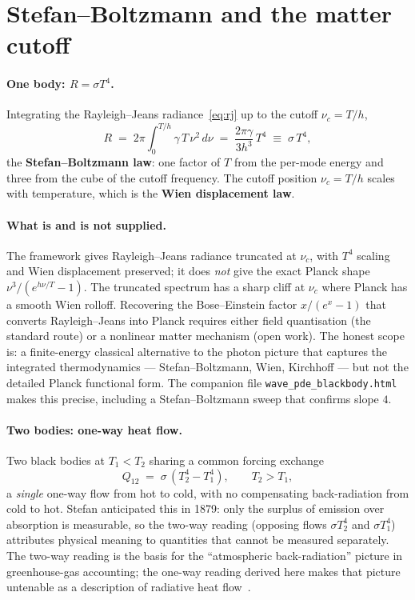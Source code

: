 \section{Stefan--Boltzmann and the matter cutoff}\label{sec:planck-cutoff}\label{sec:stefan-boltzmann}

\paragraph{One body: $R = \sigma T^4$.}
Integrating the Rayleigh--Jeans radiance~\eqref{eq:rj} up to the cutoff $\nu_c = T/h$,
\begin{equation}\label{eq:sb-onebody}
R \;=\; 2\pi\!\!\int_0^{T/h}\!\! \gamma\, T\, \nu^2\, d\nu \;=\; \frac{2\pi\gamma}{3h^3}\, T^4 \;\equiv\; \sigma\, T^4,
\end{equation}
the \textbf{Stefan--Boltzmann law}: one factor of $T$ from the per-mode energy and three from the cube of the cutoff frequency. The cutoff position $\nu_c = T/h$ scales with temperature, which is the \textbf{Wien displacement law}.

\paragraph{What is and is not supplied.}
The framework gives Rayleigh--Jeans radiance truncated at $\nu_c$, with $T^4$ scaling and Wien displacement preserved; it does \emph{not} give the exact Planck shape $\nu^3/(e^{h\nu/T}-1)$. The truncated spectrum has a sharp cliff at $\nu_c$ where Planck has a smooth Wien rolloff. Recovering the Bose--Einstein factor $x/(e^x-1)$ that converts Rayleigh--Jeans into Planck requires either field quantisation (the standard route) or a nonlinear matter mechanism (open work). The honest scope is: a finite-energy classical alternative to the photon picture that captures the integrated thermodynamics --- Stefan--Boltzmann, Wien, Kirchhoff --- but not the detailed Planck functional form. The companion file \texttt{wave\_pde\_blackbody.html} makes this precise, including a Stefan--Boltzmann sweep that confirms slope $4$.

\paragraph{Two bodies: one-way heat flow.}
Two black bodies at $T_1 < T_2$ sharing a common forcing exchange
\begin{equation}\label{eq:sb-twobody}
Q_{12} \;=\; \sigma\,(T_2^4 - T_1^4), \qquad T_2 > T_1,
\end{equation}
a \emph{single} one-way flow from hot to cold, with no compensating back-radiation from cold to hot. Stefan anticipated this in 1879: only the surplus of emission over absorption is measurable, so the two-way reading (opposing flows $\sigma T_2^4$ and $\sigma T_1^4$) attributes physical meaning to quantities that cannot be measured separately. The two-way reading is the basis for the ``atmospheric back-radiation'' picture in greenhouse-gas accounting; the one-way reading derived here makes that picture untenable as a description of radiative heat flow~\cite{BlackbodySlayer}.

